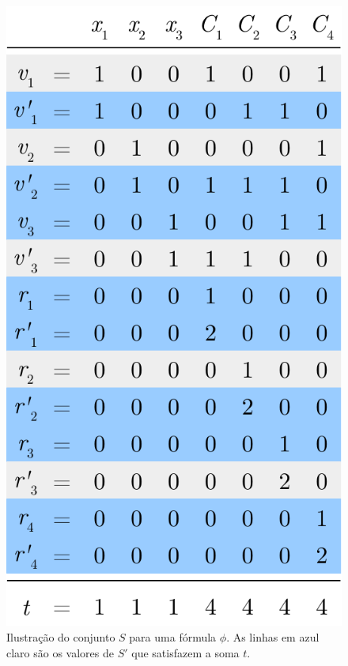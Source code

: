 \begin{figure}[h]
	\centering
	\includegraphics[scale=0.70]{./input/reducao.pdf}
	\caption{Ilustração do conjunto $S$ para uma fórmula $\phi$. As linhas em azul claro são os valores de $S'$ que satisfazem a soma $t$. \label{fig:reducao}}
\end{figure}

